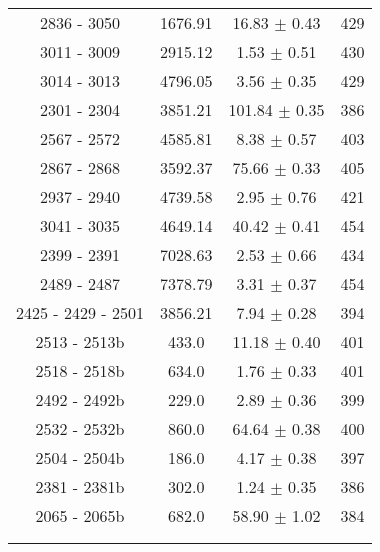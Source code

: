 \begin{longtable}{cccc}
 2836 - 3050 &  1676.91 & 16.83 $\pm$ 0.43 & 429 \\
 3011 - 3009 &  2915.12 & 1.53 $\pm$ 0.51 & 430 \\
 3014 - 3013 &  4796.05 & 3.56 $\pm$ 0.35 & 429 \\
 2301 - 2304 &  3851.21 & 101.84 $\pm$ 0.35 & 386 \\
 2567 - 2572 &  4585.81 & 8.38  $\pm$ 0.57 & 403 \\
 2867 - 2868 &  3592.37 & 75.66 $\pm$ 0.33 & 405 \\
 2937 - 2940 &  4739.58 & 2.95 $\pm$ 0.76 & 421 \\
 3041 - 3035 &  4649.14 & 40.42 $\pm$ 0.41 & 454 \\
 2399 - 2391 &  7028.63 & 2.53 $\pm$ 0.66 & 434 \\
 2489 - 2487 &  7378.79 & 3.31 $\pm$ 0.37 & 454 \\
 2425 - 2429 - 2501 & 3856.21 & 7.94 $\pm$ 0.28 &  394  \\
 2513 - 2513b  & 433.0 & 11.18 $\pm$ 0.40 & 401 \\
 2518 - 2518b  & 634.0 & 1.76 $\pm$ 0.33 & 401 \\
 2492 - 2492b  & 229.0 & 2.89 $\pm$ 0.36 & 399 \\
 2532 - 2532b  & 860.0 & 64.64 $\pm$ 0.38 & 400 \\
 2504 - 2504b  & 186.0 & 4.17 $\pm$ 0.38 & 397 \\
 2381 - 2381b  & 302.0 & 1.24 $\pm$ 0.35 & 386 \\
 2065 - 2065b  & 682.0 & 58.90 $\pm$ 1.02 & 384 \\
 \hline
\\
\label{table:catalog1}
\end{longtable}
\twocolumn


%